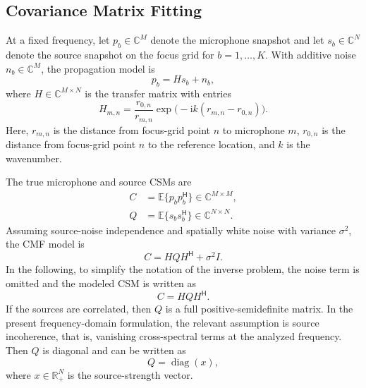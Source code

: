 \documentclass[peer-review]{fa2026}
\begin{document}
\subsection{Covariance Matrix Fitting}

At a fixed frequency, let $p_b \in \mathbb{C}^{M}$ denote the microphone snapshot and let $s_b \in \mathbb{C}^{N}$ denote the source snapshot on the focus grid for $b = 1,\dots,K$. With additive noise $n_b \in \mathbb{C}^{M}$, the propagation model is
\begin{equation}
    p_b = H s_b + n_b ,
\end{equation}
where $H \in \mathbb{C}^{M \times N}$ is the transfer matrix with entries
\begin{equation}
    H_{m,n} = \frac{r_{0,n}}{r_{m,n}} \exp\!\bigl(-\mathrm{i}k(r_{m,n}-r_{0,n})\bigr) .
\end{equation}
Here, $r_{m,n}$ is the distance from focus-grid point $n$ to microphone $m$, $r_{0,n}$ is the distance from focus-grid point $n$ to the reference location, and $k$ is the wavenumber.

The true microphone and source CSMs are
\begin{align}
    C &= \mathbb{E}\{p_b p_b^\mathsf{H}\} \in \mathbb{C}^{M \times M}, \\
    Q &= \mathbb{E}\{s_b s_b^\mathsf{H}\} \in \mathbb{C}^{N \times N} .
\end{align}
Assuming source-noise independence and spatially white noise with variance $\sigma^2$, the CMF model is
\begin{equation}
    C = H Q H^\mathsf{H} + \sigma^2 I .
\end{equation}
In the following, to simplify the notation of the inverse problem, the noise term is omitted and the modeled CSM is written as
\begin{equation}
    C = H Q H^\mathsf{H} .
\end{equation}
If the sources are correlated, then $Q$ is a full positive-semidefinite matrix. In the present frequency-domain formulation, the relevant assumption is source incoherence, that is, vanishing cross-spectral terms at the analyzed frequency. Then $Q$ is diagonal and can be written as
\begin{equation}
    Q = \operatorname{diag}(x) ,
\end{equation}
where $x \in \mathbb{R}_+^{N}$ is the source-strength vector.
\end{document}
